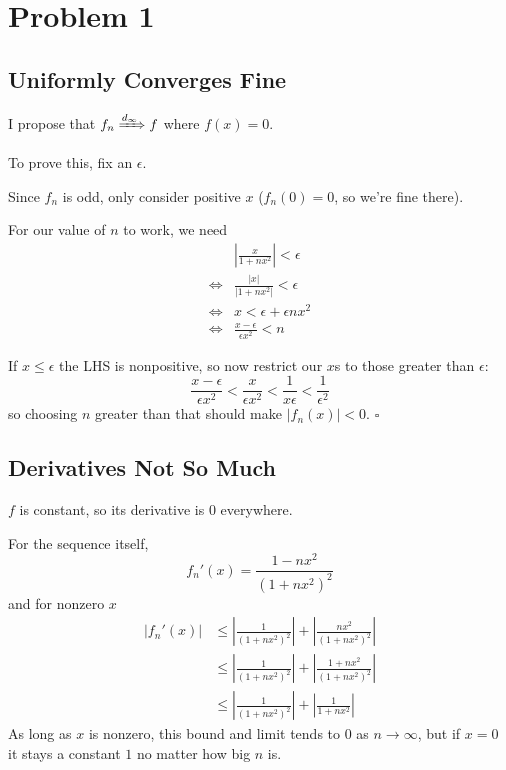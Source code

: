\documentclass[12pt]{article}
\newcommand{\ra}{\xRightarrow}
\begin{document}
\section{Problem 1}

\subsection{Uniformly Converges Fine}

I propose that $f_n \ra{d_\infty} f$ where $f(x)=0$.

To prove this, fix an $\epsilon$.

Since $f_n$ is odd, only consider positive $x$ ($f_n(0)=0$, so we're fine there).

For our value of $n$ to work, we need
\begin{align*}
         & \left|\frac{x}{1+nx^2}\right| < \epsilon \\
  \iff{} & \frac{|x|}{|1+nx^2|} < \epsilon          \\
  \iff{} & x < \epsilon + \epsilon nx^2             \\
  \iff{} & \frac{x-\epsilon}{\epsilon x^2} < n
\end{align*}

If $x \le \epsilon$ the LHS is nonpositive, so now restrict our $x$s to those greater than $\epsilon$:
\[\frac{x-\epsilon}{\epsilon x^2} < \frac{x}{\epsilon x^2} < \frac{1}{x \epsilon} < \frac{1}{\epsilon^2}\]
so choosing $n$ greater than that should make $|f_n(x)| < 0$. $\square$

\pagebreak

\subsection{Derivatives Not So Much}

$f$ is constant, so its derivative is $0$ everywhere.

For the sequence itself,
\[f_n'(x) = \frac{1-nx^2}{\left(1+nx^2\right)^2}\]
and for nonzero $x$
\begin{align*}
  |f_n'(x)|
   & \le \left|\frac{1}{(1+nx^2)^2}\right| + \left|\frac{nx^2}{\left(1+nx^2\right)^2}\right|   \\
   & \le \left|\frac{1}{(1+nx^2)^2}\right| + \left|\frac{1+nx^2}{\left(1+nx^2\right)^2}\right| \\
   & \le \left|\frac{1}{(1+nx^2)^2}\right| + \left|\frac{1}{1+nx^2}\right|
\end{align*}
As long as $x$ is nonzero, this bound and limit tends to $0$ as $n \to \infty$,
but if $x=0$ it stays a constant $1$ no matter how big $n$ is.
\end{document}
